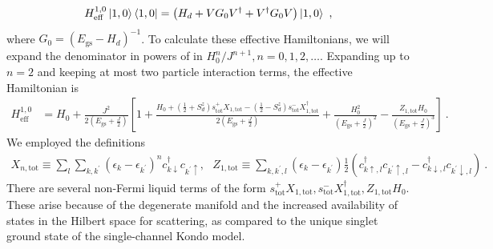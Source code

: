 \documentclass[reprint,onecolumn,prb,superscriptaddress]{revtex4-2}
\begin{document}
\begin{align}
	\label{eff_ham_10}
	H^{1,0}_\text{eff}\ket{1, 0}\bra{1, 0} = \left(H_d + V G_0 V^\dagger + V^\dagger G_0  V\right) \ket{1, 0}~,
\end{align}
where \(G_0 = \left(E_\text{gs} - H_d\right)^{-1}\). To calculate these effective Hamiltonians, we will expand the denominator in powers of in \(H_0^n/J^{n+1}, n=0,1,2,\ldots\). Expanding up to \(n=2\) and keeping at most two particle interaction terms, 
the effective Hamiltonian is
\begin{align}
	H_\text{eff}^{1, 0} &= H_0 + \frac{J^2}{2\left(E_\text{gs} + \frac{J}{2}\right)}\left[1 + \frac{ H_0 + \left(\frac{1}{2} + S_d^z\right) s^+_\text{tot}X_{1,\text{tot}} - \left(\frac{1}{2} - S_d^z\right) s^-_\text{tot}X^\dagger_{1,\text{tot}}}{2 \left(E_\text{gs} + \frac{J}{2}\right)} + \frac{H_0^2}{\left(E_\text{gs} + \frac{J}{2}\right)^2} - \frac{Z_{1,\text{tot}} H_0}{\left(E_\text{gs} + \frac{J}{2}\right)^3} \right]~.
\end{align}
We employed the definitions 
\begin{equation}\begin{aligned}
X_{n,\text{tot}} \equiv  \sum_l \sum_{k,k^\prime}\left(\epsilon_k - \epsilon_{k^\prime}\right)^n c^\dagger_{k \downarrow}c_{k^\prime \uparrow}, ~ ~ ~ Z_{1,\text{tot}} \equiv \sum_{k,k^\prime,l}\left( \epsilon_k - \epsilon_{k^\prime} \right) \frac{1}{2}\left(c^\dagger_{k \uparrow,l}c_{k^\prime \uparrow,l} - c^\dagger_{k \downarrow,l}c_{k^\prime \downarrow,l}\right)~.
\end{aligned}\end{equation}
There are several non-Fermi liquid terms of the form \(s^+_\text{tot}X_{1,\text{tot}}, s^-_\text{tot}X^\dagger_{1,\text{tot}},Z_{1,\text{tot}} H_0\). These arise because of the degenerate manifold and the increased availability of states in the Hilbert space for scattering, as compared to the unique singlet ground state of the single-channel Kondo model.
\end{document}

